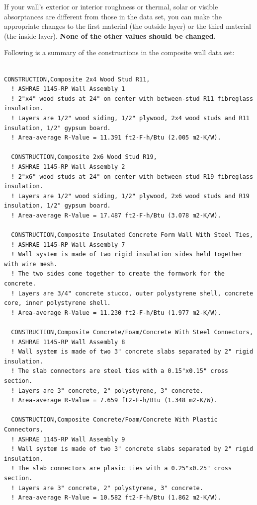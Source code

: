 If your wall's exterior or interior roughness or thermal, solar or visible absorptances are different from those in the data set, you can make the appropriate changes to the first material (the outside layer) or the third material (the inside layer). \textbf{None of the other values should be changed.}

Following is a summary of the constructions in the composite wall data set:

\begin{lstlisting}

CONSTRUCTION,Composite 2x4 Wood Stud R11,
  ! ASHRAE 1145-RP Wall Assembly 1
  ! 2"x4" wood studs at 24" on center with between-stud R11 fibreglass insulation.
  ! Layers are 1/2" wood siding, 1/2" plywood, 2x4 wood studs and R11 insulation, 1/2" gypsum board.
  ! Area-average R-Value = 11.391 ft2-F-h/Btu (2.005 m2-K/W).

  CONSTRUCTION,Composite 2x6 Wood Stud R19,
  ! ASHRAE 1145-RP Wall Assembly 2
  ! 2"x6" wood studs at 24" on center with between-stud R19 fibreglass insulation.
  ! Layers are 1/2" wood siding, 1/2" plywood, 2x6 wood studs and R19 insulation, 1/2" gypsum board.
  ! Area-average R-Value = 17.487 ft2-F-h/Btu (3.078 m2-K/W).

  CONSTRUCTION,Composite Insulated Concrete Form Wall With Steel Ties,
  ! ASHRAE 1145-RP Wall Assembly 7
  ! Wall system is made of two rigid insulation sides held together with wire mesh.
  ! The two sides come together to create the formwork for the concrete.
  ! Layers are 3/4" concrete stucco, outer polystyrene shell, concrete core, inner polystyrene shell.
  ! Area-average R-Value = 11.230 ft2-F-h/Btu (1.977 m2-K/W).

  CONSTRUCTION,Composite Concrete/Foam/Concrete With Steel Connectors,
  ! ASHRAE 1145-RP Wall Assembly 8
  ! Wall system is made of two 3" concrete slabs separated by 2" rigid insulation.
  ! The slab connectors are steel ties with a 0.15"x0.15" cross section.
  ! Layers are 3" concrete, 2" polystyrene, 3" concrete.
  ! Area-average R-Value = 7.659 ft2-F-h/Btu (1.348 m2-K/W).

  CONSTRUCTION,Composite Concrete/Foam/Concrete With Plastic Connectors,
  ! ASHRAE 1145-RP Wall Assembly 9
  ! Wall system is made of two 3" concrete slabs separated by 2" rigid insulation.
  ! The slab connectors are plasic ties with a 0.25"x0.25" cross section.
  ! Layers are 3" concrete, 2" polystyrene, 3" concrete.
  ! Area-average R-Value = 10.582 ft2-F-h/Btu (1.862 m2-K/W).


\end{lstlisting}

